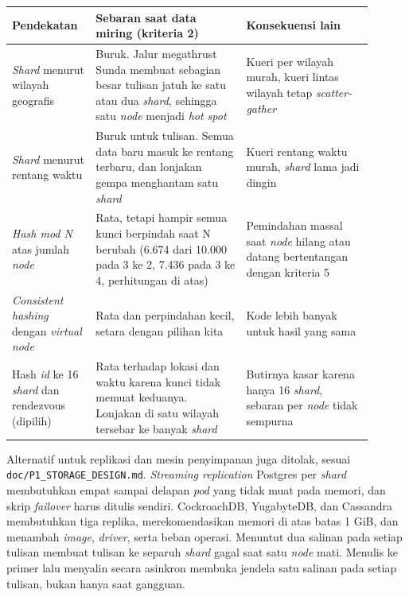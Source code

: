 \begin{longtable}[]{|>{\raggedright\arraybackslash}p{0.2\linewidth}|>{\raggedright\arraybackslash}p{0.38\linewidth}|>{\raggedright\arraybackslash}p{0.32\linewidth}|}
\hline
\textbf{Pendekatan} & \textbf{Sebaran saat data miring (kriteria 2)} & \textbf{Konsekuensi lain} \\
\hline
\endhead
\textit{Shard} menurut wilayah geografis & Buruk. Jalur megathrust Sunda membuat sebagian besar tulisan jatuh ke satu atau dua \textit{shard}, sehingga satu \textit{node} menjadi \textit{hot spot} & Kueri per wilayah murah, kueri lintas wilayah tetap \textit{scatter-gather} \\
\hline
\textit{Shard} menurut rentang waktu & Buruk untuk tulisan. Semua data baru masuk ke rentang terbaru, dan lonjakan gempa menghantam satu \textit{shard} & Kueri rentang waktu murah, \textit{shard} lama jadi dingin \\
\hline
\textit{Hash mod N} atas jumlah \textit{node} & Rata, tetapi hampir semua kunci berpindah saat N berubah (6.674 dari 10.000 pada 3 ke 2, 7.436 pada 3 ke 4, perhitungan di atas) & Pemindahan massal saat \textit{node} hilang atau datang bertentangan dengan kriteria 5 \\
\hline
\textit{Consistent hashing} dengan \textit{virtual node} & Rata dan perpindahan kecil, setara dengan pilihan kita & Kode lebih banyak untuk hasil yang sama \\
\hline
Hash \textit{id} ke 16 \textit{shard} dan rendezvous (dipilih) & Rata terhadap lokasi dan waktu karena kunci tidak memuat keduanya. Lonjakan di satu wilayah tersebar ke banyak \textit{shard} & Butirnya kasar karena hanya 16 \textit{shard}, sebaran per \textit{node} tidak sempurna \\
\hline
\end{longtable}

Alternatif untuk replikasi dan mesin penyimpanan juga ditolak, sesuai \texttt{doc/P1\_STORAGE\_DESIGN.md}. \textit{Streaming replication} Postgres per \textit{shard} membutuhkan empat sampai delapan \textit{pod} yang tidak muat pada memori, dan skrip \textit{failover} harus ditulis sendiri. CockroachDB, YugabyteDB, dan Cassandra membutuhkan tiga replika, merekomendasikan memori di atas batas 1 GiB, dan menambah \textit{image}, \textit{driver}, serta beban operasi. Menuntut dua salinan pada setiap tulisan membuat tulisan ke separuh \textit{shard} gagal saat satu \textit{node} mati. Menulis ke primer lalu menyalin secara asinkron membuka jendela satu salinan pada setiap tulisan, bukan hanya saat gangguan.

